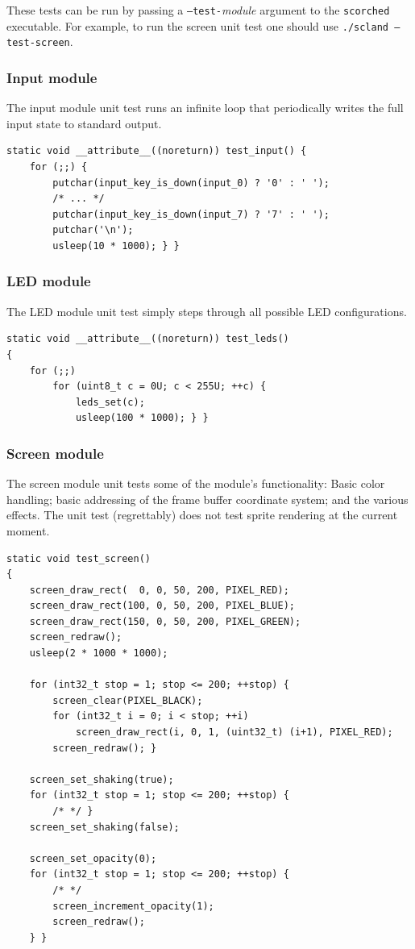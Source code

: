 \documentclass[a4paper,10pt]{article}
\begin{document}
These tests can be run by passing a \texttt{--test-}\emph{module} argument to
the \texttt{scorched} executable. For example, to run the screen unit test one
should use \texttt{./scland --test-screen}.

\subsubsection{Input module}
The input module unit test runs an infinite loop that periodically writes the
full input state to standard output.
\begin{lstlisting}
static void __attribute__((noreturn)) test_input() {
    for (;;) {
        putchar(input_key_is_down(input_0) ? '0' : ' ');
        /* ... */
        putchar(input_key_is_down(input_7) ? '7' : ' ');
        putchar('\n');
        usleep(10 * 1000); } }
\end{lstlisting}

\subsubsection{LED module}
The LED module unit test simply steps through all possible LED configurations.

\begin{lstlisting}
static void __attribute__((noreturn)) test_leds()
{
    for (;;)
        for (uint8_t c = 0U; c < 255U; ++c) {
            leds_set(c);
            usleep(100 * 1000); } }
\end{lstlisting}

\subsubsection{Screen module}
The screen module unit tests some of the module's functionality: Basic color
handling; basic addressing of the frame buffer coordinate system; and the
various effects. The unit test (regrettably) does not test sprite rendering at
the current moment. 

\begin{lstlisting}
static void test_screen()
{
    screen_draw_rect(  0, 0, 50, 200, PIXEL_RED);
    screen_draw_rect(100, 0, 50, 200, PIXEL_BLUE);
    screen_draw_rect(150, 0, 50, 200, PIXEL_GREEN);
    screen_redraw();
    usleep(2 * 1000 * 1000);

    for (int32_t stop = 1; stop <= 200; ++stop) {
        screen_clear(PIXEL_BLACK);
        for (int32_t i = 0; i < stop; ++i)
            screen_draw_rect(i, 0, 1, (uint32_t) (i+1), PIXEL_RED);
        screen_redraw(); }

    screen_set_shaking(true);
    for (int32_t stop = 1; stop <= 200; ++stop) {
        /* */ }
    screen_set_shaking(false);

    screen_set_opacity(0);
    for (int32_t stop = 1; stop <= 200; ++stop) {
        /* */
        screen_increment_opacity(1);
        screen_redraw();
    } }
\end{lstlisting}
\end{document}
